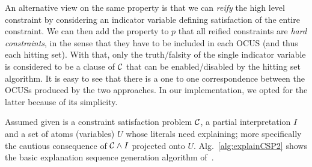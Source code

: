 {An alternative view on the same property is that we can \emph{reify} the high level constraint by considering an indicator variable defining satisfaction of the entire constraint. 
We can then add the property to $p$ that all reified constraints are \emph{hard constraints}, in the sense that they have to be included in each OCUS (and thus each hitting set). With that, only the truth/falsity of the single indicator variable is considered to be a clause of $\mathcal{C} $ that can be enabled/disabled by the hitting set algorithm. 
It is easy to see that there is a one to one correspondence between the OCUSs produced by the two approaches. In our implementation, we opted for the latter because of its simplicity. 
}

Assumed given is a constraint satisfaction problem $\mathcal{C} $, a partial interpretation $I$ and a set of atoms (variables) $U$ whose literals need explaining; more specifically the cautious consequence of $\mathcal{C}  \wedge I$ projected onto $U$. %
 Alg.~\ref{alg:explainCSP2} shows the basic explanation sequence generation algorithm of~\cite{bogaerts2020framework}.



\newcommand\onestep{\ensuremath{\call{explain-One-Step}}\xspace}

